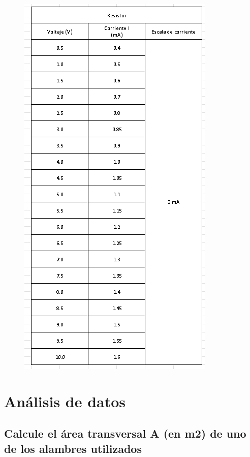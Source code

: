 \documentclass[letterpaper, 12pt]{article}
\begin{document}
\begin{multicols}{2}
	\begin{figure}[H]
		\includegraphics[scale = .64]{./Images/Table2.png}
	\end{figure}

\end{multicols}

\section{Análisis de datos}

\subsection*{Calcule el área transversal A (en m2)
	de uno de los alambres utilizados}
\end{document}
